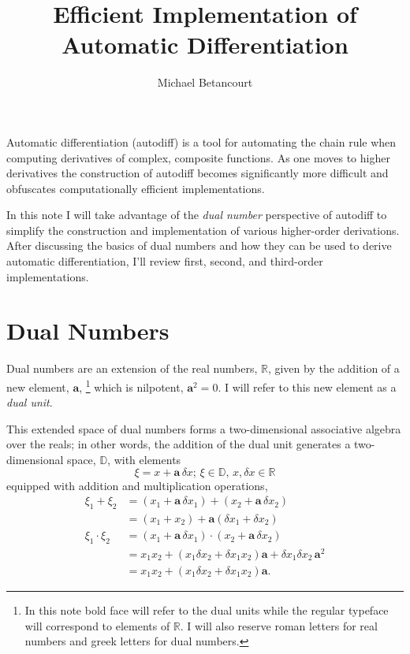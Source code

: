 \documentclass[11pt]{article}
\title{Efficient Implementation of Automatic Differentiation}
\author{Michael Betancourt}
\date{}
\begin{document}
\maketitle

Automatic differentiation (autodiff) is a tool for automating the chain rule when 
computing derivatives of complex, composite functions.  As one moves to higher 
derivatives the construction of autodiff becomes significantly more difficult and 
obfuscates computationally efficient implementations.

In this note I will take advantage of the \textit{dual number} perspective of autodiff
to simplify the construction and implementation of various higher-order derivations.
After discussing the basics of dual numbers and how they can be used to derive
automatic differentiation, I'll review first, second, and third-order implementations.

\section*{Dual Numbers}

Dual numbers are an extension of the real numbers, $\mathbb{R}$, given by the
addition of a new element, $\mathbf{a}$,%
%
\footnote{In this note bold face will refer to the dual units while the regular
typeface will correspond to elements of $\mathbb{R}$.  I will also reserve
roman letters for real numbers and greek letters for dual numbers.}
%
which is nilpotent, $\mathbf{a}^{2} = 0$. I will refer to this new element as a \textit{dual unit}.

This extended space of dual numbers forms a two-dimensional associative algebra 
over the reals; in other words, the addition of the dual unit generates a two-dimensional
space, $\mathbb{D}$, with elements
%
\begin{equation*}
\xi = x + \mathbf{a} \, \delta x; \, \xi \in \mathbb{D}, \, x, \delta x \in \mathbb{R}
\end{equation*}
%
equipped with addition and multiplication operations,
%
\begin{align*}
\xi_{1} + \xi_{2} &= \left( x_{1} + \mathbf{a} \, \delta x_{1} \right) + \left( x_{2} + \mathbf{a} \,  \delta x_{2} \right) 
\\
&= \left( x_{1} + x_{2} \right) + \mathbf{a} \left( \delta x_{1} + \delta x_{2} \right) 
\\
\xi_{1} \cdot \xi_{2} 
&= \left( x_{1} + \mathbf{a} \, \delta x_{1} \right) \cdot \left( x_{2} + \mathbf{a} \, \delta x_{2} \right) 
\\
&= x_{1} x_{2} + \left( x_{1} \delta x_{2} + \delta x_{1} x_{2} \right) \mathbf{a} + \delta x_{1} \delta x_{2} \, \mathbf{a}^{2} 
\\
&= x_{1} x_{2} + \left( x_{1} \delta x_{2} + \delta x_{1} x_{2} \right) \mathbf{a}.
\end{align*}  
\end{document}
